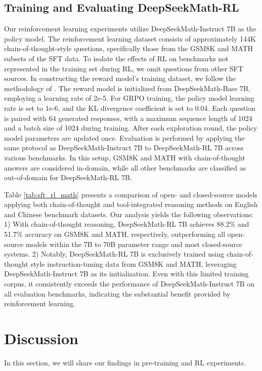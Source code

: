 \begin{itemize}[topsep=0pt]
\begin{itemize}[topsep=0pt]
\subsection{Training and Evaluating DeepSeekMath-RL}

Our reinforcement learning experiments utilize DeepSeekMath-Instruct 7B as the policy model. The reinforcement learning dataset consists of approximately 144K chain-of-thought-style questions, specifically those from the GSM8K and MATH subsets of the SFT data. To isolate the effects of RL on benchmarks not represented in the training set during RL, we omit questions from other SFT sources. In constructing the reward model's training dataset, we follow the methodology of \citep{wang2023math}. The reward model is initialized from DeepSeekMath-Base 7B, employing a learning rate of 2e-5. For GRPO training, the policy model learning rate is set to 1e-6, and the KL divergence coefficient is set to 0.04. Each question is paired with $64$ generated responses, with a maximum sequence length of 1024 and a batch size of 1024 during training. After each exploration round, the policy model parameters are updated once. Evaluation is performed by applying the same protocol as DeepSeekMath-Instruct 7B to DeepSeekMath-RL 7B across various benchmarks. In this setup, GSM8K and MATH with chain-of-thought answers are considered in-domain, while all other benchmarks are classified as out-of-domain for DeepSeekMath-RL 7B.

Table \ref{tab:sft_rl_math} presents a comparison of open- and closed-source models applying both chain-of-thought and tool-integrated reasoning methods on English and Chinese benchmark datasets. Our analysis yields the following observations: 1) With chain-of-thought reasoning, DeepSeekMath-RL 7B achieves 88.2\% and 51.7\% accuracy on GSM8K and MATH, respectively, outperforming all open-source models within the 7B to 70B parameter range and most closed-source systems. 2) Notably, DeepSeekMath-RL 7B is exclusively trained using chain-of-thought style instruction-tuning data from GSM8K and MATH, leveraging DeepSeekMath-Instruct 7B as its initialization. Even with this limited training corpus, it consistently exceeds the performance of DeepSeekMath-Instruct 7B on all evaluation benchmarks, indicating the substantial benefit provided by reinforcement learning.

\section{Discussion}
In this section, we will share our findings in pre-training and RL experiments. 


\end{itemize}
\end{itemize}
